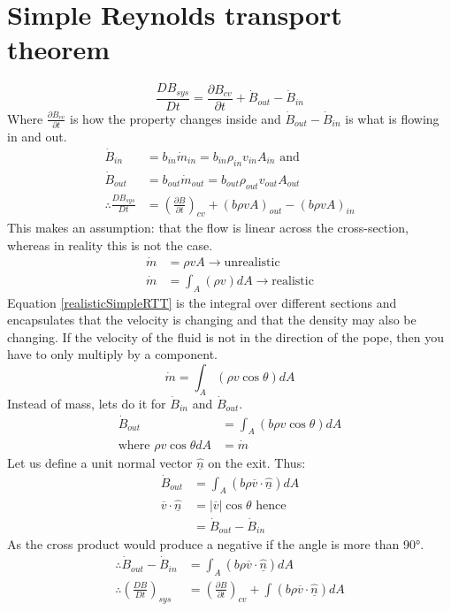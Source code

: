 \documentclass[class=report, crop=false, 12pt,a4paper]{standalone}
\begin{document}
\section{Simple Reynolds transport theorem}
\begin{equation}
  \frac{DB_{sys}}{Dt} = \frac{\partial B_{cv}}{\partial t} + \dot{B}_{out} - \dot{B}_{in}
\end{equation}
Where $\frac{\partial B_{cv}}{\partial t}$ is how the property changes inside and $\dot{B}_{out} - \dot{B}_{in}$ is what is flowing in and out.
\begin{align}
  \dot{B}_{in} &= b_{in} \dot{m}_{in} = b_{in}\rho_{in}v_{in}A_{in} \textrm{ and}\\
  \dot{B}_{out} &= b_{out} \dot{m}_{out} = b_{out}\rho_{out}v_{out}A_{out}\\
  \therefore \frac{DB_{sys}}{Dt} &= \left( \frac{\partial B}{\partial t} \right)_{cv} + (b \rho v A)_{out} - (b \rho v A)_{in}
\end{align}
This makes an assumption: that the flow is linear across the cross-section, whereas in reality this is not the case.
\begin{align}
  \dot{m} &= \rho v A \rightarrow \textrm{unrealistic}\\
  \dot{m} &= \int_A (\rho v) dA \rightarrow \textrm{realistic} \label{realisticSimpleRTT}
\end{align}
Equation \ref{realisticSimpleRTT} is the integral over different sections and encapsulates that the velocity is changing and that the density may also be changing. If the velocity of the fluid is not in the direction of the pope, then you have to only multiply by a component.
\begin{equation}
  \dot{m} = \int_A (\rho v \cos{\theta})dA 
\end{equation}
Instead of mass, lets do it for $\dot{B}_{in}$ and $\dot{B}_{out}$. 
\begin{align}
  \dot{B}_{out} &= \int_A (b \rho v \cos{\theta})dA\\ 
  \textrm{where } \rho v \cos{\theta} dA &= \dot{m}
\end{align}
Let us define a unit normal vector $\underline{\hat{n}}$ on the exit. Thus:
\begin{align}
  \dot{B}_{out} &= \int_A (b \rho \overline{v} \cdot \underline{\hat{n}}) dA\\
  \overline{v} \cdot \underline{\hat{n}} &= |\overline{v}| \cos{\theta} \textrm{ hence}\\
  &= \dot{B}_{out} - \dot{B}_{in}
\end{align}
As the cross product would produce a negative if the angle is more than \ang{90}.
\begin{align}
  \therefore \dot{B}_{out} - \dot{B}_{in} &= \int_A (b \rho \overline{v}\cdot \underline{\hat{n}})dA\\
  \therefore \left( \frac{DB}{Dt} \right)_{sys} &= \left( \frac{\partial B}{\partial t} \right)_{cv} + \int (b \rho \overline{v}\cdot \underline{\hat{n}}) dA
\end{align}
\end{document}
